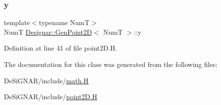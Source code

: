 \subsubsection{\texorpdfstring{y}{y}}
{\footnotesize\ttfamily template$<$typename NumT$>$ \\
NumT \hyperlink{class_designar_1_1_gen_point2_d}{Designar\+::\+Gen\+Point2D}$<$ NumT $>$\+::y\hspace{0.3cm}{\ttfamily [protected]}}



Definition at line 41 of file point2\+D.\+H.



The documentation for this class was generated from the following files\+:\begin{DoxyCompactItemize}
\item 
De\+Si\+G\+N\+A\+R/include/\hyperlink{math_8_h}{math.\+H}\item 
De\+Si\+G\+N\+A\+R/include/\hyperlink{point2_d_8_h}{point2\+D.\+H}\end{DoxyCompactItemize}
